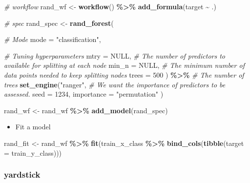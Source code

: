 \documentclass[
]{book}
\newenvironment{Shaded}{\begin{snugshade}}{\end{snugshade}}
\newcommand{\AttributeTok}[1]{\textcolor[rgb]{0.13,0.29,0.53}{#1}}
\newcommand{\CommentTok}[1]{\textcolor[rgb]{0.56,0.35,0.01}{\textit{#1}}}
\newcommand{\ConstantTok}[1]{\textcolor[rgb]{0.56,0.35,0.01}{#1}}
\newcommand{\DecValTok}[1]{\textcolor[rgb]{0.00,0.00,0.81}{#1}}
\newcommand{\FunctionTok}[1]{\textcolor[rgb]{0.13,0.29,0.53}{\textbf{#1}}}
\newcommand{\NormalTok}[1]{#1}
\newcommand{\OtherTok}[1]{\textcolor[rgb]{0.56,0.35,0.01}{#1}}
\newcommand{\SpecialCharTok}[1]{\textcolor[rgb]{0.81,0.36,0.00}{\textbf{#1}}}
\newcommand{\StringTok}[1]{\textcolor[rgb]{0.31,0.60,0.02}{#1}}
\providecommand{\tightlist}{%
  \setlength{\itemsep}{0pt}\setlength{\parskip}{0pt}}
\begin{document}
\begin{Shaded}
\begin{Highlighting}[]
\CommentTok{\# workflow}
\NormalTok{rand\_wf }\OtherTok{\textless{}{-}} \FunctionTok{workflow}\NormalTok{() }\SpecialCharTok{\%\textgreater{}\%} \FunctionTok{add\_formula}\NormalTok{(target }\SpecialCharTok{\textasciitilde{}}\NormalTok{ .)}

\CommentTok{\# spec}
\NormalTok{rand\_spec }\OtherTok{\textless{}{-}} \FunctionTok{rand\_forest}\NormalTok{(}

  \CommentTok{\# Mode}
  \AttributeTok{mode =} \StringTok{"classification"}\NormalTok{,}

  \CommentTok{\# Tuning hyperparameters}
  \AttributeTok{mtry =} \ConstantTok{NULL}\NormalTok{, }\CommentTok{\# The number of predictors to available for splitting at each node}
  \AttributeTok{min\_n =} \ConstantTok{NULL}\NormalTok{, }\CommentTok{\# The minimum number of data points needed to keep splitting nodes}
  \AttributeTok{trees =} \DecValTok{500}
\NormalTok{) }\SpecialCharTok{\%\textgreater{}\%} \CommentTok{\# The number of trees}
  \FunctionTok{set\_engine}\NormalTok{(}\StringTok{"ranger"}\NormalTok{,}
    \CommentTok{\# We want the importance of predictors to be assessed.}
    \AttributeTok{seed =} \DecValTok{1234}\NormalTok{,}
    \AttributeTok{importance =} \StringTok{"permutation"}
\NormalTok{  )}

\NormalTok{rand\_wf }\OtherTok{\textless{}{-}}\NormalTok{ rand\_wf }\SpecialCharTok{\%\textgreater{}\%} \FunctionTok{add\_model}\NormalTok{(rand\_spec)}
\end{Highlighting}
\end{Shaded}

\begin{itemize}
\tightlist
\item
  Fit a model
\end{itemize}

\begin{Shaded}
\begin{Highlighting}[]
\NormalTok{rand\_fit }\OtherTok{\textless{}{-}}\NormalTok{ rand\_wf }\SpecialCharTok{\%\textgreater{}\%} \FunctionTok{fit}\NormalTok{(train\_x\_class }\SpecialCharTok{\%\textgreater{}\%} \FunctionTok{bind\_cols}\NormalTok{(}\FunctionTok{tibble}\NormalTok{(}\AttributeTok{target =}\NormalTok{ train\_y\_class)))}
\end{Highlighting}
\end{Shaded}

\subsubsection{yardstick}\label{yardstick-2}
\end{document}
